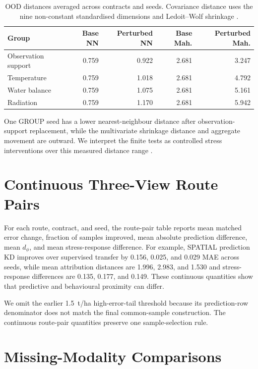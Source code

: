 \documentclass[runningheads]{venue/lncs/llncs}
\begin{document}
\begin{table}[h]
\centering
\caption{OOD distances averaged across contracts and seeds. Covariance distance uses the nine non-constant standardised dimensions and Ledoit--Wolf shrinkage \cite{LedoitWolf2004}.}
\small
\begin{tabular}{lrrrr}
\toprule
Group & Base NN & Perturbed NN & Base Mah. & Perturbed Mah.\\
\midrule
Observation support & 0.759 & 0.922 & 2.681 & 3.247\\
Temperature & 0.759 & 1.018 & 2.681 & 4.792\\
Water balance & 0.759 & 1.075 & 2.681 & 5.161\\
Radiation & 0.759 & 1.170 & 2.681 & 5.942\\
\bottomrule
\end{tabular}
\end{table}

One GROUP seed has a lower nearest-neighbour distance after observation-support replacement, while the multivariate shrinkage distance and aggregate movement are outward. We interpret the finite tests as controlled stress interventions over this measured distance range \cite{Covert2021Removing,Hase2021OODExplainability}.

\section{Continuous Three-View Route Pairs}

For each route, contract, and seed, the route-pair table reports mean matched error change, fraction of samples improved, mean absolute prediction difference, mean $d_{\phi}$, and mean stress-response difference. For example, SPATIAL prediction KD improves over supervised transfer by 0.156, 0.025, and 0.029 MAE across seeds, while mean attribution distances are 1.996, 2.983, and 1.530 and stress-response differences are 0.135, 0.177, and 0.149. These continuous quantities show that predictive and behavioural proximity can differ.

We omit the earlier 1.5~t/ha high-error-tail threshold because its prediction-row denominator does not match the final common-sample construction. The continuous route-pair quantities preserve one sample-selection rule.

\section{Missing-Modality Comparisons}\label{sec:missing}
\end{document}
